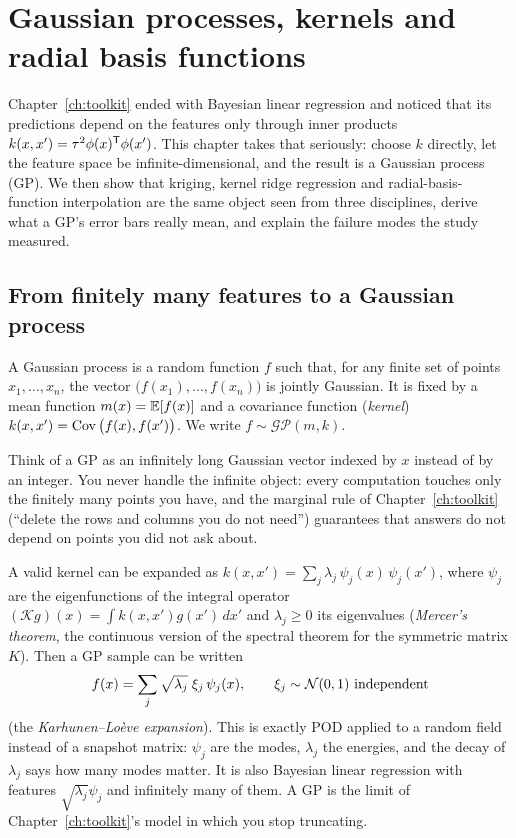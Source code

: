 \chapter[Gaussian processes and kernels]{Gaussian processes, kernels and radial basis functions}
\label{ch:gp}

Chapter~\ref{ch:toolkit} ended with Bayesian linear regression and noticed that its predictions depend on the
features only through inner products $k(x,x') = \tau^2\phi(x)^{\mathsf{T}}\phi(x')$. This chapter takes that seriously: choose
$k$ directly, let the feature space be infinite-dimensional, and the result is a Gaussian process (GP). We then show
that kriging, kernel ridge regression and radial-basis-function interpolation are the same object seen from three
disciplines, derive what a GP's error bars really mean, and explain the failure modes the study measured.

\section{From finitely many features to a Gaussian process}

\begin{definition}
A Gaussian process is a random function $f$ such that, for any finite set of points $x_1,\dots,x_n$, the vector
$\big(f(x_1),\dots,f(x_n)\big)$ is jointly Gaussian. It is fixed by a mean function $m(x) = \mathbb{E}[f(x)]$ and a
covariance function (\emph{kernel}) $k(x,x') = \operatorname{Cov}\big(f(x), f(x')\big)$. We write $f \sim \mathcal{GP}(m, k)$.
\end{definition}

Think of a GP as an infinitely long Gaussian vector indexed by $x$ instead of by an integer. You never handle the
infinite object: every computation touches only the finitely many points you have, and the marginal rule of
Chapter~\ref{ch:toolkit} (``delete the rows and columns you do not need'') guarantees that answers do not depend on
points you did not ask about.

\begin{connection}
A valid kernel can be expanded as $k(x,x') = \sum_{j} \lambda_j\, \psi_j(x)\,\psi_j(x')$, where $\psi_j$ are the
eigenfunctions of the integral operator $(\mathcal{K}g)(x) = \int k(x,x')g(x')\,dx'$ and $\lambda_j \ge 0$ its
eigenvalues (\emph{Mercer's theorem}, the continuous version of the spectral theorem for the symmetric matrix $K$).
Then a GP sample can be written
\begin{equation}
  f(x) = \sum_j \sqrt{\lambda_j}\; \xi_j\, \psi_j(x), \qquad \xi_j \sim \mathcal{N}(0,1) \text{ independent}
  \label{eq:kl}
\end{equation}
(the \emph{Karhunen--Lo\`eve expansion}). This is exactly POD applied to a random field instead of a snapshot
matrix: $\psi_j$ are the modes, $\lambda_j$ the energies, and the decay of $\lambda_j$ says how many modes matter.
It is also Bayesian linear regression with features $\sqrt{\lambda_j}\psi_j$ and infinitely many of them. A GP is
the limit of Chapter~\ref{ch:toolkit}'s model in which you stop truncating.
\end{connection}

